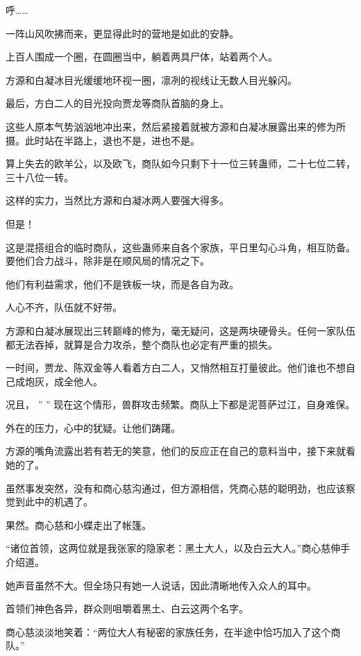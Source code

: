
\begin{this_body}

呼……

一阵山风吹拂而来，更显得此时的营地是如此的安静。

上百人围成一个圈，在圆圈当中，躺着两具尸体，站着两个人。

方源和白凝冰目光缓缓地环视一圈，凛冽的视线让无数人目光躲闪。

最后，方白二人的目光投向贾龙等商队首脑的身上。

这些人原本气势汹汹地冲出来，然后紧接着就被方源和白凝冰展露出来的修为所摄。此时站在半路上，退也不是，进也不是。

算上失去的欧羊公，以及欧飞，商队如今只剩下十一位三转蛊师，二十七位二转，三十八位一转。

这样的实力，当然比方源和白凝冰两人要强大得多。

但是！

这是混搭组合的临时商队，这些蛊师来自各个家族，平日里勾心斗角，相互防备。要他们合力战斗，除非是在顺风局的情况之下。

他们有利益需求，他们不是铁板一块，而是各自为政。

人心不齐，队伍就不好带。

方源和白凝冰展现出三转巅峰的修为，毫无疑问，这是两块硬骨头。任何一家队伍都无法吞掉，就算是合力攻杀，整个商队也必定有严重的损失。

一时间，贾龙、陈双金等人看着方白二人，又悄然相互打量彼此。他们谁也不想自己成炮灰，成全他人。

况且， ” ” 现在这个情形，兽群攻击频繁。商队上下都是泥菩萨过江，自身难保。

外在的压力，心中的犹疑。让他们踌躇。

方源的嘴角流露出若有若无的笑意，他们的反应正在自己的意料当中，接下来就看她的了。

虽然事发突然，没有和商心慈沟通过，但方源相信，凭商心慈的聪明劲，也应该察觉到此中的机遇了。

果然。商心慈和小蝶走出了帐篷。

“诸位首领，这两位就是我张家的隐家老：黑土大人，以及白云大人。”商心慈伸手介绍道。

她声音虽然不大。但全场只有她一人说话，因此清晰地传入众人的耳中。

首领们神色各异，群众则咀嚼着黑土、白云这两个名字。

商心慈淡淡地笑着：“两位大人有秘密的家族任务，在半途中恰巧加入了这个商队。”


\end{this_body}
